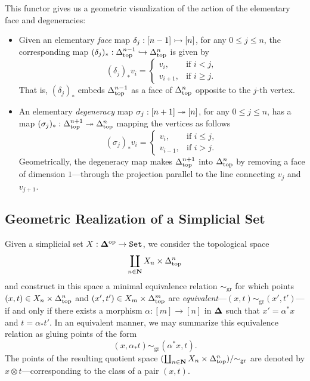 This functor gives us a geometric visualization of the action of the elementary
face and degeneracies:
\begin{itemize}\setlength\itemsep{0em}
    \item Given an elementary \emph{face} map \(\delta_j: [n-1] \rightarrowtail [n]\), for any
          \(0 \leq j \leq n\), the corresponding map
          \((\delta_j)_{*}: \Delta_{\text{top}}^{n-1} \hookrightarrow \Delta_{\text{top}}^n\) is given by
          \[
              (\delta_j)_{*} v_i =
              \begin{cases}
                  v_i,     & \text{if } i < j,    \\
                  v_{i+1}, & \text{if } i \geq j.
              \end{cases}
          \]
          That is, \((\delta_j)_{*}\) embeds \(\Delta_{\text{top}}^{n-1}\) as a face of
          \(\Delta_{\text{top}}^n\) opposite to the \(j\)-th vertex.

    \item An elementary \emph{degeneracy} map \(\sigma_j: [n+1] \twoheadrightarrow [n]\), for any
          \(0 \leq j \leq n\), has a map
          \((\sigma_j)_{*}: \Delta_{\text{top}}^{n+1} \twoheadrightarrow \Delta_{\text{top}}^n\) mapping the vertices as
          follows
          \[
              (\sigma_j)_{*} v_i =
              \begin{cases}
                  v_i,     & \text{if } i \leq j, \\
                  v_{i-1}, & \text{if } i > j.
              \end{cases}
          \]
          Geometrically, the degeneracy map makes \(\Delta_{\text{top}}^{n+1}\) into \(\Delta_{\text{top}}^n\)
          by removing a face of dimension \(1\)---through the projection parallel to the
          line connecting \(v_j\) and \(v_{j+1}\).
\end{itemize}

\subsection{Geometric Realization of a Simplicial Set}

Given a simplicial set \(X: {\mathbf{\Delta}}^{\mathrm{op}} \to {\texttt{Set}}\), we consider the topological
space
\[
    \coprod_{n \in \mathbf{N}} X_n \times \Delta_{\text{top}}^n
\]
and construct in this space a minimal equivalence relation \(\sim_{\text{gr}}\)
for which points \((x, t) \in X_n \times \Delta_{\text{top}}^n\) and
\((x', t') \in X_m \times \Delta_{\text{top}}^m\) are
\emph{equivalent}---\((x, t) \sim_{\text{gr}} (x', t')\)---if and only if there
exists a morphism \(\alpha: [m] \to [n]\) in \({\mathbf{\Delta}}\) such that
\(x' = \alpha^{*} x\) and \(t = \alpha_{*} t'\). In an equivalent manner, we may
summarize this equivalence relation as gluing points of the form
\[
    (x, \alpha_{*} t) \sim_{\text{gr}} (\alpha^{*} x, t).
\]
The points of the resulting quotient space
\((\coprod_{n \in \mathbf{N}} X_n \times \Delta_{\text{top}}^n)/{\sim_{\text{gr}}}\) are denoted by
\(x \otimes t\)---corresponding to the class of a pair \((x, t)\).

